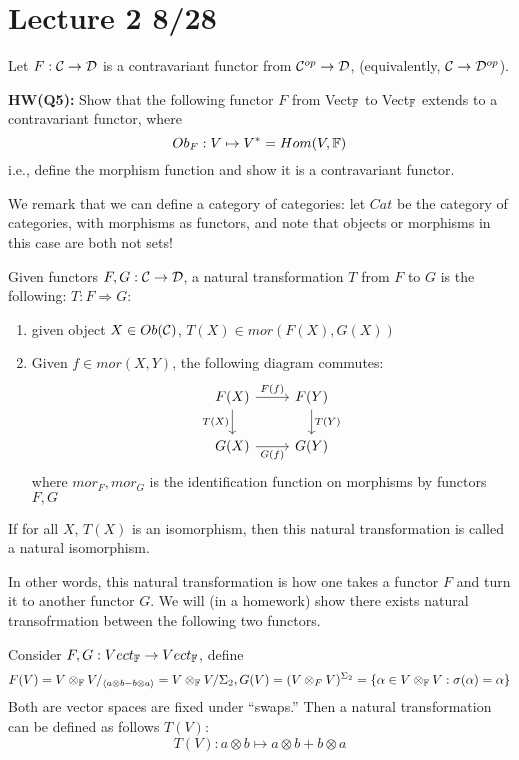 \section{Lecture 2 8/28}
\begin{defn}
    Let $F:\mathcal{C}\to\mathcal{D}$ is a contravariant functor from $\mathcal{C}^{op}\to\mathcal{D}$, (equivalently, $\mathcal{C}\to\mathcal{D}^{op}$).
\end{defn}
\begin{prob}
    \textbf{HW(Q5):} Show that the following functor $F$ from Vect$_{\mathbb{F}}$ to Vect$_{\mathbb{F}}$ extends to a contravariant functor, where 
    \begin{equation*}
        Ob_F: V\mapsto V^*=Hom(V,\mathbb{F})
    \end{equation*}
    i.e., define the morphism function and show it is a contravariant functor.
\end{prob}
We remark that we can define a category of categories: let $Cat$ be the category of categories, with morphisms as functors, and note that objects or morphisms in this case are both not sets!
\begin{defn}
    Given functors $F,G: \mathcal{C}\to\mathcal{D}$, a natural transformation $T$ from $F$ to $G$ is the following: $T: F\Rightarrow G$:
    \begin{enumerate}
        \item given object $X\in Ob(\mathcal{C})$, $T(X)\in mor(F(X),G(X))$
        \item Given $f\in mor(X,Y)$, the following diagram commutes:
        \[\begin{tikzcd}
            {F(X)} & {F(Y)} \\
            {G(X)} & {G(Y)}
            \arrow["{F(f)}", from=1-1, to=1-2]
            \arrow["{T(X)}"', from=1-1, to=2-1]
            \arrow["{T(Y)}", from=1-2, to=2-2]
            \arrow["{G(f)}"', from=2-1, to=2-2]
        \end{tikzcd}\]
        where $mor_F, mor_G$ is the identification function on morphisms by functors $F,G$
    \end{enumerate}
    If for all $X$, $T(X)$ is an isomorphism, then this natural transformation is called a natural isomorphism.
\end{defn}
In other words, this natural transformation is how one takes a functor $F$ and turn it to another functor $G$. We will (in a homework) show there exists natural transofrmation between the following two functors.
\begin{example}
    Consider $F,G: Vect_{\mathbb{F}}\to Vect_{\mathbb{F}}$, define 
    \begin{equation*}
        F(V)=V\otimes_{\mathbb{F}} V/_{\langle a\otimes b-b\otimes a\rangle}=V\otimes_{\mathbb{F}} V/\Sigma_2, G(V)=(V\otimes_F V)^{\Sigma_2}=\{\alpha\in V\otimes_{\mathbb{F}} V: \sigma(\alpha)=\alpha\}
    \end{equation*}
    Both are vector spaces are fixed under ``swaps.'' Then a natural transformation can be defined as follows $T(V):$
    \begin{equation*}
        T(V): a\otimes b\mapsto a\otimes b+b\otimes a
    \end{equation*}
\end{example}
